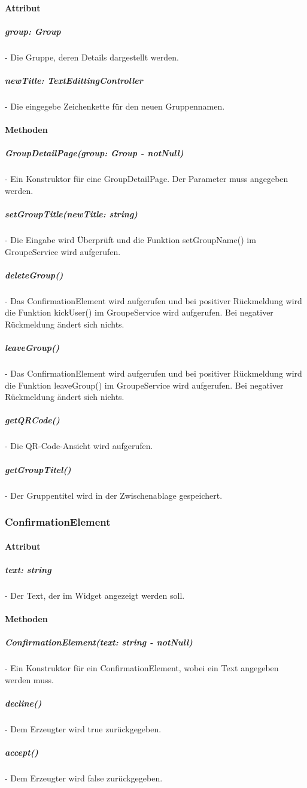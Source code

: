 \documentclass[parskip=full]{scrartcl}
\begin{document}
        \paragraph*{Attribut}
            \subparagraph*{group: Group} - Die Gruppe, deren Details dargestellt werden.
            \subparagraph*{newTitle: TextEdittingController} - Die eingegebe Zeichenkette für den neuen Gruppennamen.

        \paragraph*{Methoden}
            \subparagraph*{GroupDetailPage(group: Group - notNull)} - Ein Konstruktor für eine GroupDetailPage. Der Parameter muss angegeben werden. 
            \subparagraph*{setGroupTitle(newTitle: string)} - Die Eingabe wird Überprüft und die Funktion setGroupName() im GroupeService wird aufgerufen.
            \subparagraph*{deleteGroup()} - Das ConfirmationElement wird aufgerufen und bei positiver Rückmeldung wird die Funktion kickUser() im GroupeService wird aufgerufen. Bei negativer Rückmeldung ändert sich nichts.
            \subparagraph*{leaveGroup()} - Das ConfirmationElement wird aufgerufen und bei positiver Rückmeldung wird die Funktion leaveGroup() im GroupeService wird aufgerufen. Bei negativer Rückmeldung ändert sich nichts.

            \subparagraph*{getQRCode()} - Die QR-Code-Ansicht wird aufgerufen.
            \subparagraph*{getGroupTitel()} - Der Gruppentitel wird in der Zwischenablage gespeichert.

    \subsubsection{ConfirmationElement} \label{sec:ConfirmationElement}
        \paragraph*{Attribut}
            \subparagraph*{text: string} - Der Text, der im Widget angezeigt werden soll.

        \paragraph*{Methoden}
            \subparagraph*{ConfirmationElement(text: string - notNull)} - Ein Konstruktor für ein ConfirmationElement, wobei ein Text angegeben werden muss.
            \subparagraph*{decline()} - Dem Erzeugter wird true zurückgegeben.
            \subparagraph*{accept()} - Dem Erzeugter wird false zurückgegeben.
\end{document}
